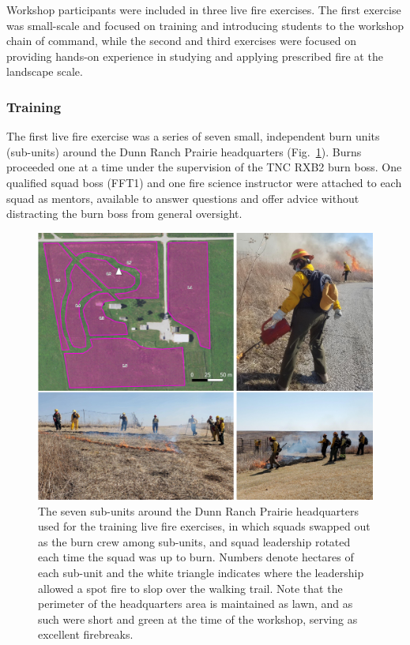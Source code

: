 \documentclass[fire,article,submit,moreauthors,pdftex]{Definitions/mdpi}
\begin{document}
Workshop participants were included in three live fire exercises.
The first exercise was small-scale and focused on training and introducing students to the workshop chain of command, while the second and third exercises were focused on providing hands-on experience in studying and applying prescribed fire at the landscape scale.

\hypertarget{training}{%
\subsubsection{Training}\label{training}}

The first live fire exercise was a series of seven small, independent burn units (sub-units) around the Dunn Ranch Prairie headquarters (Fig.~\ref{HQmap}).
Burns proceeded one at a time under the supervision of the TNC RXB2 burn boss.
One qualified squad boss (FFT1) and one fire science instructor were attached to each squad as mentors, available to answer questions and offer advice without distracting the burn boss from general oversight.

\begin{figure}
\centering
\includegraphics[width=1\columnwidth]{HQburns.pdf}
\caption{\label{HQmap}The seven sub-units around the Dunn Ranch Prairie headquarters used for the training live fire exercises, in which squads swapped out as the burn crew among sub-units, and squad leadership rotated each time the squad was up to burn. Numbers denote hectares of each sub-unit and the white triangle indicates where the leadership allowed a spot fire to slop over the walking trail. Note that the perimeter of the headquarters area is maintained as lawn, and as such were short and green at the time of the workshop, serving as excellent firebreaks.}
\end{figure}
\end{document}

